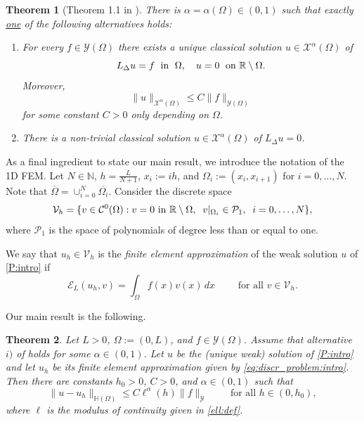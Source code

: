 \documentclass[11 pt]{article}
\newtheorem{theorem}{Theorem}[section]
\numberwithin{equation}{section}
\def\R{\mathbb{R}}
\def\cE{\mathcal{E}}
\begin{document}
\begin{theorem}[Theorem 1.1 in \cite{CS22}]\label{eq:regularity}
    There is $\alpha=\alpha(\Omega)\in(0,1)$ such that exactly \underline{one} of the following alternatives holds:
    \begin{enumerate}[label=\roman*)]
        \item For every $f\in\mathcal Y(\Omega)$ there exists a unique classical solution $u\in\mathcal X^{\alpha}(\Omega)$ of
        \begin{equation}\label{eq:log_problem}
            L_{\Delta} u = f \;\textnormal{ in }\; \Omega, \quad u=0 \;\textnormal{ on } \R\setminus \Omega.
        \end{equation}
        Moreover,
        \begin{equation}\label{eq:regularity_classical}
            \|u\|_{\mathcal X^{\alpha}(\Omega)}\leq C\|f\|_{\mathcal Y(\Omega)}
        \end{equation}
        for some constant $C>0$ only depending on $\Omega$.
        \item There is a non-trivial classical solution $u\in {\mathcal X}^{\alpha}(\Omega)$ of $L_{\Delta} u=0$.
    \end{enumerate}
\end{theorem}

As a final ingredient to state our main result, we introduce the notation of the 1D FEM.  Let $N\in\mathbb N$, $h=\frac{L}{N+1}$, $x_i:=ih$, and $\Omega_i:=(x_{i},x_{i+1})$ for $i=0,\ldots,N$. Note that $\overline{\Omega}=\cup_{i=0}^N \overline{\Omega_i}$. Consider the discrete space
%
\begin{equation*}
    \mathcal V_h=\{v\in \mathcal C^0(\Omega): v=0 \textnormal{ in } \R\setminus \Omega, \;\; v|_{\Omega_i}\in \mathcal P_1, \;\;  i=0,\ldots,N\},
\end{equation*}
%
where $\mathcal P_1$ is the space of polynomials of degree less than or equal to one.

We say that  $u_h\in \mathcal V_h$ is the \emph{finite element approximation} of the weak solution $u$ of \eqref{P:intro} if \begin{equation}\label{eq:discr_problem:intro}
    \cE_{L}(u_h,v)=\int_{\Omega} f(x) v(x)\, dx \qquad \text{ for all } v\in \mathcal V_h.
\end{equation}


 Our main result is the following.
 \begin{theorem}\label{main:thm:intro}
    Let $L>0$, $\Omega:=(0,L)$, and $f\in \mathcal{Y}(\Omega)$.  Assume that alternative $i)$ of  holds for some $\alpha\in(0,1)$. Let $u$ be the (unique weak) solution of \eqref{P:intro} and let $u_h$ be its finite element approximation given by \eqref{eq:discr_problem:intro}. Then there are constants $h_0>0$, $C>0$, and $\alpha\in(0,1)$ such that
    \begin{equation*}
        \|u-u_h\|_{\mathbb H(\Omega)}\leq C\ell^{\alpha}(h)\|f\|_{\mathcal Y}\qquad \text{ for all }h\in(0,h_0),
    \end{equation*}
    where $\ell$ is the modulus of continuity given in \eqref{ell:def}.
 \end{theorem}
\end{document}
